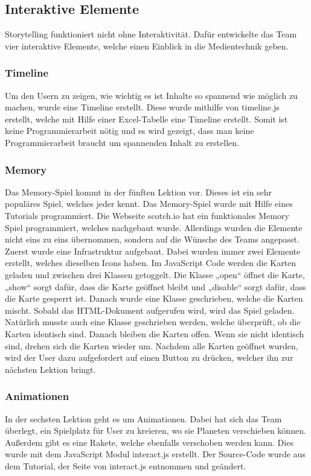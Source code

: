 \subsection{Interaktive Elemente}

Storytelling funktioniert nicht ohne Interaktivität.  Dafür entwickelte das Team vier interaktive Elemente, welche einen Einblick in die Medientechnik geben. 
\subsubsection{Timeline}
Um den Usern zu zeigen, wie wichtig es ist Inhalte so spannend wie möglich zu machen, wurde eine Timeline erstellt. Diese wurde mithilfe von timeline.js erstellt, welche mit Hilfe einer Excel-Tabelle eine Timeline erstellt. Somit ist keine Programmierarbeit nötig und es wird gezeigt, dass man keine Programmierarbeit braucht um spannenden Inhalt zu erstellen.
\subsubsection{Memory}
Das Memory-Spiel kommt in der fünften Lektion vor. Dieses ist ein sehr populäres Spiel, welches jeder kennt. Das Memory-Spiel wurde mit Hilfe eines Tutorials programmiert. Die Webseite scotch.io  hat ein funktionales Memory Spiel programmiert, welches nachgebaut wurde. Allerdings wurden die Elemente nicht eins zu eins übernommen, sondern auf die Wünsche des Teams angepasst. Zuerst wurde eine Infrastruktur aufgebaut. Dabei wurden immer zwei Elemente erstellt, welches dieselben Icons haben. Im JavaScript Code werden die Karten geladen und zwischen drei Klassen getoggelt. Die Klasse „open“ öffnet die Karte, „show“ sorgt dafür, dass die Karte geöffnet bleibt und „disable“ sorgt dafür, dass die Karte gesperrt ist. Danach wurde eine Klasse geschrieben, welche die Karten mischt. Sobald das HTML-Dokument aufgerufen wird, wird das Spiel geladen. Natürlich musste auch eine Klasse geschrieben werden, welche überprüft, ob die Karten identisch sind. Danach bleiben die Karten offen. Wenn sie nicht identisch sind, drehen sich die Karten wieder um. Nachdem alle Karten geöffnet wurden, wird der User dazu aufgefordert auf einen Button zu drücken, welcher ihn zur nächsten Lektion bringt. 

\subsubsection{Animationen}
In der sechsten Lektion geht es um Animationen. Dabei hat sich das Team überlegt, ein Spielplatz für User zu kreieren, wo sie Planeten verschieben können. Außerdem gibt es eine Rakete, welche ebenfalls verschoben werden kann. Dies wurde mit dem JavaScript Modul interact.js erstellt. Der Source-Code wurde aus dem Tutorial, der Seite von interact.js entnommen und geändert. 


